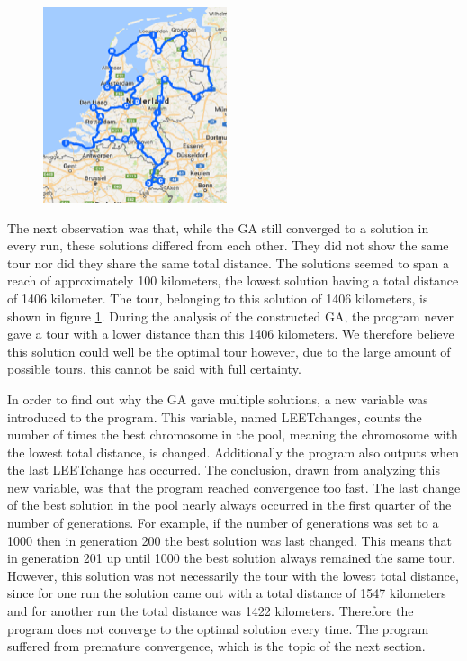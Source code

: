 \begin{figure}
	\vspace{-1cm}
	\begin{center}
		\includegraphics[width=0.48\textwidth]{1406tour}
	\end{center}	
	\label{1406tour}
\end{figure}

The next observation was that, while the GA still converged to a solution in every run, these solutions differed from each other. They did not show the same tour nor did they share the same total distance. The solutions seemed to span a reach of approximately 100 kilometers, the lowest solution having a total distance of 1406 kilometer. The tour, belonging to this solution of 1406 kilometers, is shown in figure \ref{1406tour}. During the analysis of the constructed GA, the program never gave a tour with a lower distance than this 1406 kilometers. We therefore believe this solution could well be the optimal tour however, due to the large amount of possible tours, this cannot be said with full certainty. 

\par
In order to find out why the GA gave multiple solutions, a new variable was introduced to the program. This variable, named LEETchanges, counts the number of times the best chromosome in the pool, meaning the chromosome with the lowest total distance, is changed. Additionally the program also outputs when the last LEETchange has occurred. The conclusion, drawn from analyzing this new variable, was that the program reached convergence too fast. The last change of the best solution in the pool nearly always occurred in the first quarter of the number of generations. For example, if the number of generations was set to a 1000 then in generation 200 the best solution was last changed. This means that in generation 201 up until 1000 the best solution always remained the same tour. However, this solution was not necessarily the tour with the lowest total distance, since for one run the solution came out with a total distance of 1547 kilometers and for another run the total distance was 1422 kilometers. Therefore the program does not converge to the optimal solution every time. The program suffered from premature convergence, which is the topic of the next section. 

